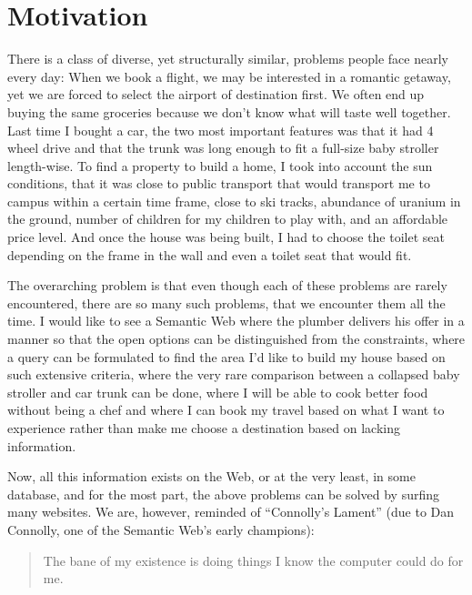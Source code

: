 \section{Motivation}\label{sec:motivation}

There is a class of diverse, yet structurally similar, problems people
face nearly every day: When we book a flight, we may be interested in
a romantic getaway, yet we are forced to select the airport of
destination first. We often end up buying the same groceries because
we don't know what will taste well together. Last time I bought a car,
the two most important features was that it had 4 wheel drive and that
the trunk was long enough to fit a full-size baby stroller
length-wise. To find a property to build a home, I took into account
the sun conditions, that it was close to public transport that would
transport me to campus within a certain time frame, close to
ski tracks, abundance of uranium in the ground, number of children for
my children to play with, and an affordable price level. And once the
house was being built, I had to choose the toilet seat depending on
the frame in the wall and even a toilet seat that would fit.

The overarching problem is that even though each of these problems are
rarely encountered, there are so many such problems, that we encounter
them all the time. I would like to see a Semantic Web where the
plumber delivers his offer in a manner so that the open options can be
distinguished from the constraints, where a query can be formulated to
find the area I'd like to build my house based on such extensive
criteria, where the very rare comparison between a collapsed baby
stroller and car trunk can be done, where I will be able to cook
better food without being a chef and where I can book my travel based
on what I want to experience rather than make me choose a destination
based on lacking information.

Now, all this information exists on the Web, or at the very least, in
some database, and for the most part, the above problems can be
solved by surfing many websites. We are, however, reminded of ``Connolly's
Lament'' (due to Dan Connolly, one of the Semantic Web's early champions):
\begin{quote}
 The bane of my existence is doing things I know the computer could do
 for me.
\end{quote}
